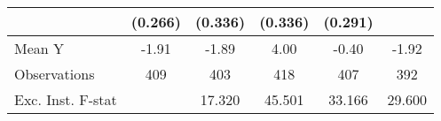 {\begin{tabular}{l*{5}{c}}
            &     (0.266)         &     (0.336)         &     (0.336)         &     (0.291)         &                     \\
\midrule
Mean Y      &       -1.91         &       -1.89         &        4.00         &       -0.40         &       -1.92         \\
Observations&         409         &         403         &         418         &         407         &         392         \\
Exc. Inst. F-stat&                     &      17.320         &      45.501         &      33.166         &      29.600         \\
\bottomrule
\end{tabular}
}
